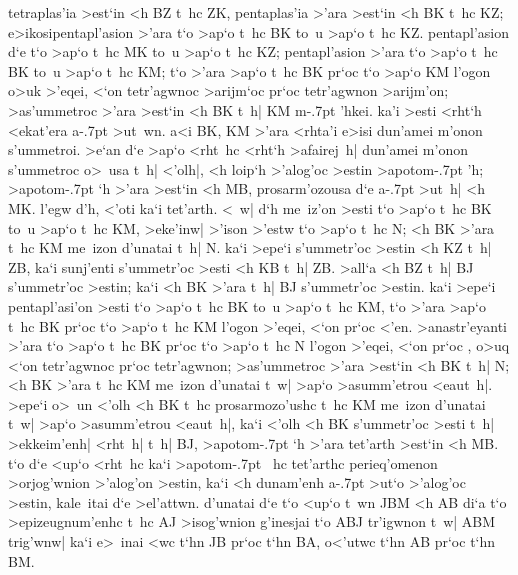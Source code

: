 \begin{Parallel}{}{}
{{tetraplas'ia >est`in <h BZ t~hc ZK, pentaplas'ia >'ara >est`in
<h BK t~hc  KZ;
e>ikosipentapl'asion >'ara t`o >ap`o t~hc BK to~u >ap`o t~hc KZ.
pentapl'asion d`e t`o >ap`o t~hc MK to~u >ap`o t~hc KZ; pentapl'asion
>'ara t`o >ap`o t~hc BK to~u >ap`o t~hc KM; t`o >'ara >ap`o t~hc
BK pr`oc t`o >ap`o KM l'ogon o>uk >'eqei, <`on tetr'agwnoc >arijm`oc
pr`oc tetr'agwnon >arijm'on; >as'ummetroc >'ara >est`in <h BK t~h| KM
m\kern -.7pt 'hkei. ka'i >esti <rht`h <ekat'era a\kern -.7pt >ut~wn. a<i BK, KM >'ara
<rhta'i e>isi dun'amei m'onon s'ummetroi. >e`an d`e >ap`o <rht~hc
<rht`h >afairej~h| dun'amei m'onon s'ummetroc o>~usa t~h|
<'olh|, <h loip`h >'alog'oc >estin >apotom\kern -.7pt 'h; >apotom\kern -.7pt `h >'ara
>est`in <h MB, prosarm'ozousa d`e a\kern -.7pt >ut~h| <h MK. l'egw d'h,
<'oti ka`i tet'arth. <~w| d`h me~iz'on >esti t`o >ap`o t~hc BK
to~u >ap`o t~hc KM, >eke'inw| >'ison >'estw t`o >ap`o t~hc
N; <h BK >'ara t~hc KM
me~izon d'unatai t~h| N. ka`i >epe`i
s'ummetr'oc >estin <h KZ t~h| ZB, ka`i sunj'enti s'ummetr'oc >esti <h KB t~h| ZB. >all`a <h BZ t~h| BJ s'ummetr'oc >estin; ka`i <h BK >'ara t~h|
BJ s'ummetr'oc >estin. ka`i >epe`i pentapl'asi'on >esti t`o >ap`o t~hc
BK to~u >ap`o t~hc KM, t`o >'ara >ap`o t~hc BK pr`oc t`o >ap`o
t~hc KM l'ogon >'eqei, <`on  pr`oc <'en. >anastr'eyanti >'ara
t`o >ap`o t~hc BK pr`oc t`o >ap`o t~hc N l'ogon >'eqei, <`on 
pr`oc , o>uq <`on tetr'agwnoc pr`oc tetr'agwnon; >as'ummetroc
>'ara >est`in <h BK t~h| N; <h BK >'ara t~hc KM me~izon
d'unatai t~w| >ap`o >asumm'etrou <eaut~h|. >epe`i o>~un <'olh
<h BK t~hc prosarmozo'ushc t~hc KM me~izon d'unatai t~w| >ap`o
>asumm'etrou <eaut~h|, ka`i <'olh <h BK s'ummetr'oc >esti t~h| >ekkeim'enh|
<rht~h| t~h| BJ, >apotom\kern -.7pt `h >'ara tet'arth >est`in <h MB. t`o d`e <up`o <rht~hc
ka`i >apotom\kern -.7pt ~hc tet'arthc perieq'omenon >orjog'wnion >'alog'on >estin,
ka`i <h dunam'enh a\kern -.7pt >ut`o >'alog'oc >estin, kale~itai d`e >el'attwn. d'unatai
d`e t`o <up`o t~wn JBM <h AB di`a t`o >epizeugnum'enhc
t~hc AJ >isog'wnion g'inesjai t`o ABJ tr'igwnon t~w| ABM trig'wnw|
ka`i e>~inai <wc t`hn JB pr`oc t`hn BA, o<'utwc t`hn AB pr`oc
t`hn BM.}

}

\end{Parallel}
